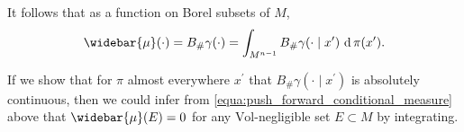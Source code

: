 It follows that as a function on Borel subsets of $M$,
\begin{equation}
	\label{equa:push_forward_conditional_measure}
	\widebar{\mu}(\cdot) = B_{\#} \gamma (\cdot)= \int_{M^{n-1}} B_{\#} \gamma(\cdot \mid x^\prime)\, \diff \pi(x^\prime).
\end{equation}

If we show that for $\pi$ almost everywhere $x^\prime$ that
$B_{\#} \gamma(\cdot \mid x^\prime)$ is absolutely continuous,
then we could infer from \cref{equa:push_forward_conditional_measure} above that
$\widebar{\mu}(E)=0$ for any $\text{Vol}$-negligible set $E \subset M$ by integrating.

